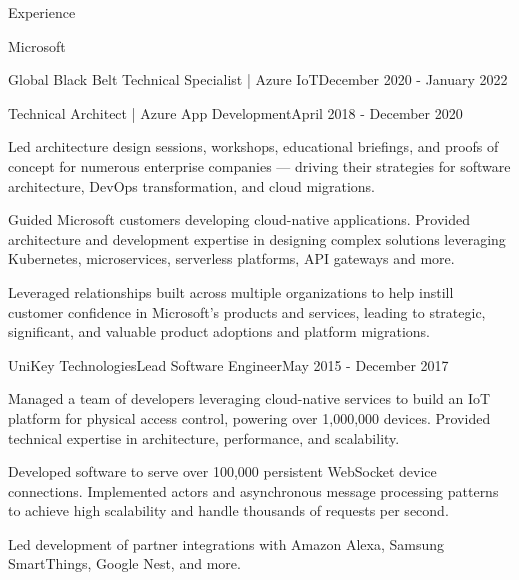 \documentclass{resume} %
\begin{document}
\begin{rSection}{Experience}
\begin{rSubsection}{Microsoft}{}{}
\begin{rSubSubsection}{Global Black Belt Technical Specialist | Azure IoT}{December 2020 - January 2022}{}{}
    \end{rSubSubsection}


    \begin{rSubSubsection}{Technical Architect | Azure App Development}{April 2018 - December 2020}{}{}

        \item Led architecture design sessions, workshops, educational briefings, and proofs of concept for numerous enterprise companies --- driving their strategies for software architecture, DevOps transformation, and cloud migrations.
        \item Guided Microsoft customers developing cloud-native applications.  Provided architecture and development expertise in designing complex solutions leveraging Kubernetes, microservices, serverless platforms, API gateways and more.
        \item Leveraged relationships built across multiple organizations to help instill customer confidence in Microsoft's products and services, leading to strategic, significant, and valuable product adoptions and platform migrations.
        
    \end{rSubSubsection}
    
    
\end{rSubsection}


\begin{rSubsection}{UniKey Technologies}{Lead Software Engineer}{May 2015 - December 2017}

\item Managed a team of developers leveraging cloud-native services to build an IoT platform for physical access control, powering over 1,000,000 devices.  Provided technical expertise in architecture, performance, and scalability.
\item Developed software to serve over 100,000 persistent WebSocket device connections. Implemented actors and asynchronous message processing patterns to achieve high scalability and handle thousands of requests per second.
\item Led development of partner integrations with Amazon Alexa, Samsung SmartThings, Google Nest, and more.

\end{rSubsection}



\end{rSection}
\end{document}
